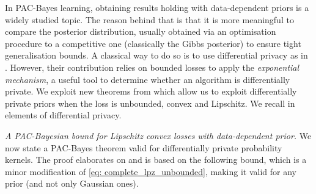 In PAC-Bayes learning, obtaining results holding with data-dependent priors is a widely studied topic. The reason behind that is that it is more meaningful to compare the posterior distribution, usually obtained via an optimisation procedure to a competitive one (classically the Gibbs posterior) to ensure tight generalisation bounds.
A classical way to do so is to use differential privacy as in \citet{dziugaite2018data}. However, their contribution relies on bounded losses to apply the \emph{exponential mechanism}, a useful tool to determine whether an algorithm is differentially private. We exploit new theorems from \citet{minami2016diff,rogers2016max} which allow us to exploit differentially private priors when the loss is unbounded, convex and Lipschitz. We recall in  elements of differential privacy.

\textit{A PAC-Bayesian bound for Lipschitz convex losses with data-dependent prior.} We now state a PAC-Bayes theorem valid for differentially private probability kernels. The proof elaborates on \citet[Theorem 4.2]{dziugaite2018data} and is based on the following bound, which is a minor modification of \eqref{eq: complete_lpz_unbounded}, making it valid for any prior (and not only Gaussian ones).

